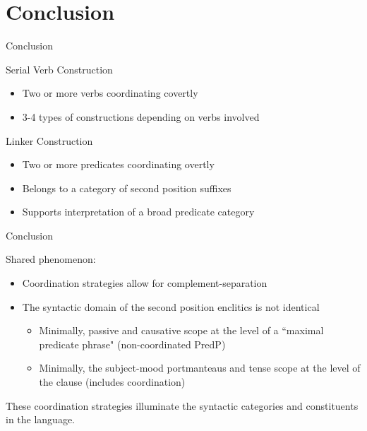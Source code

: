 \section{Conclusion}

\begin{frame}{Conclusion}

Serial Verb Construction
\begin{itemize}
\item Two or more verbs coordinating	 covertly
\item 3-4 types of constructions depending on verbs involved
\end{itemize}

Linker Construction
\begin{itemize}
\item Two or more predicates coordinating overtly
\item Belongs to a category of second position suffixes
\item Supports interpretation of a broad predicate category
\end{itemize}

\end{frame}

\begin{frame}{Conclusion}

Shared phenomenon:
\begin{itemize}
\item Coordination strategies allow for complement-separation
\item The syntactic domain of the second position enclitics is not identical
\begin{itemize}
\item Minimally, passive and causative scope at the level of a ``maximal predicate phrase" (non-coordinated PredP)
\item Minimally, the subject-mood portmanteaus and tense scope at the level of the clause (includes coordination)
\end{itemize}
\end{itemize}

These coordination strategies illuminate the syntactic categories and constituents in the language.

\end{frame}

